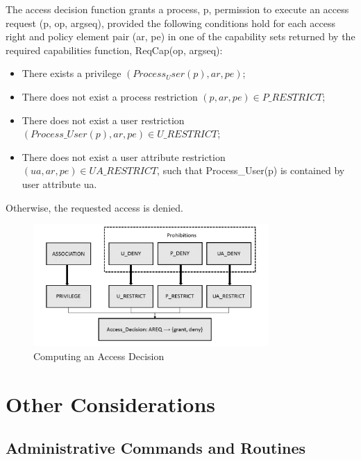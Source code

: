 \documentclass[12pt,a4paper,titlepage]{book}
\begin{document}
	The access decision function grants a process, p, permission to execute an access request (p, op, argseq), provided the following conditions hold for each access right and policy element pair (ar, pe) in one of the capability sets returned by the required capabilities function, ReqCap(op, argseq):
	
	\begin{itemize}
		
		\item There exists a privilege $ (Process_User(p), ar, pe) $;
		
		\item There does not exist a process restriction $ (p, ar, pe) \in P\_RESTRICT $;
		
		\item There does not exist a user restriction $ (Process\_User(p), ar, pe) \in U\_RESTRICT $;
		
		\item There does not exist a user attribute restriction $ (ua, ar, pe) \in UA\_RESTRICT $, such that Process\_User(p) is contained by user attribute ua.
		
	\end{itemize}
	
	Otherwise, the requested access is denied.
	
	\begin{figure}[h]
		\centering
		\includegraphics[width = 0.8\textwidth]{images/ComputingAccessDecision.png}
		\caption{Computing an Access Decision}
		\label{fig:ComputingAccessDecision}
	\end{figure}
	
	\chapter{Other Considerations}
	
	\section{Administrative Commands and Routines}
	
\end{document}
